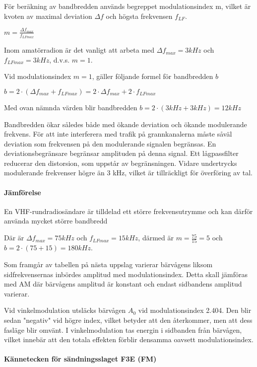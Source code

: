 För beräkning av bandbredden används begreppet modulationsindex m, vilket är kvoten av
maximal deviation \(\Delta f\) och högsta frekvensen \(f_{LF}\).

\(m = \frac{\Delta f_{max}}{f_{LFmax}}\)

Inom amatörradion är det vanligt att arbeta med \(\Delta f_{max} = 3 kHz\) och
\(f_{LFmax} = 3 kHz\), d.v.s. \(m = 1\).

Vid modulationsindex \(m = 1\), gäller följande
formel för bandbredden \(b\)

\(b = 2 \cdot ( \Delta f_{max} + f_{LFmax}) = 2 \cdot \Delta f_{max} + 2 \cdot f_{LFmax}\)

Med ovan nämnda värden blir bandbredden \(b = 2 \cdot (3 kHz + 3 kHz) = 12 kHz\)

Bandbredden ökar således både med ökande deviation och ökande modulerande frekvens. För
att inte interferera med trafik på grannkanalerna måste såväl deviation som frekvensen på
den modulerande signalen begränsas. En deviationsbegränsare begränsar amplituden på denna
signal. Ett lågpassfilter reducerar den distorsion, som uppstår av begränsningen. Vidare
undertrycks modulerande frekvenser högre än 3 kHz, vilket är tillräckligt för överföring
av tal.

\paragraph{Jämförelse}

En VHF-rundradiosändare är tilldelad ett större frekvensutrymme och kan därför använda
mycket större bandbredd

Där är \(\Delta f_{max} = 75 kHz\) och \(f_{LFmax} =15 kHz\), därmed är \(m = \frac{75}{15} = 5\)
och \(b = 2 \cdot (75 + 15) = 180 kHz\).

Som framgår av tabellen på nästa uppslag varierar bärvågens liksom sidfrekvensernas
inbördes amplitud med modulationsindex. Detta skall jämföras med AM där bärvågens amplitud
är konstant och endast sidbandens amplitud varierar.

Vid vinkelmodulation utsläcks bärvågen \(A_0\) vid modulationsindex 2.404. Den blir sedan
"negativ" vid högre index, vilket betyder att den återkommer, men att dess fasläge blir
omvänt. I vinkelmodulation tas energin i sidbanden från bärvågen, vilket innebär att
den totala effekten förblir densamma oavsett modulationsindex.

\paragraph{Kännetecken för sändningsslaget F3E (FM)}

